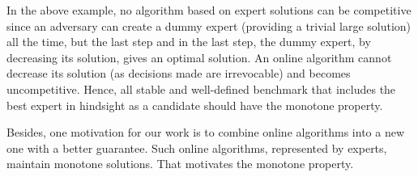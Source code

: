 In the above example, no algorithm based on expert solutions can be competitive
since an adversary can create a dummy expert (providing a trivial large solution) all the time, but the last step
and in the last step, the dummy expert, by decreasing its solution, gives an optimal solution.
An online algorithm cannot decrease its solution (as decisions made are irrevocable)
and becomes uncompetitive. Hence, all stable and well-defined benchmark that includes the best expert in hindsight as a candidate should have the monotone property.

Besides, one motivation for our work is to combine online algorithms into a new one with a better guarantee.
Such online algorithms, represented by experts, maintain monotone solutions. That motivates the monotone property.



%
